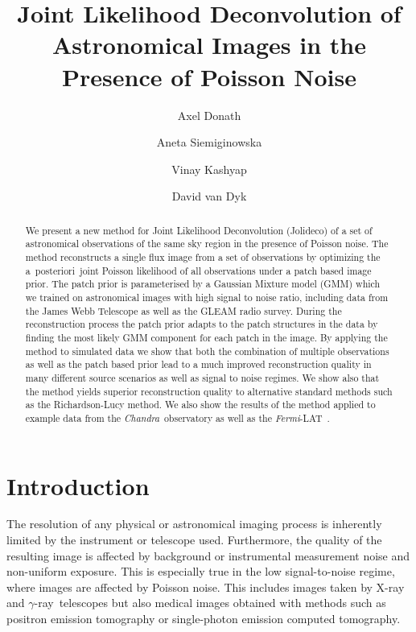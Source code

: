 \documentclass[twocolumn]{aastex631}
\newcommand{\chandra}{\textit{Chandra}~}
\newcommand{\fermi}{\textit{Fermi}-LAT~}
\newcommand{\aposteriori}{a~posteriori~}
\newcommand{\gammaray}{$\gamma$-ray\xspace}
\newcommand{\xray}{X-ray\xspace}
\begin{document}
    \title{Joint Likelihood Deconvolution of Astronomical Images in the Presence of Poisson Noise}

    \author[0000-0003-4568-7005]{Axel Donath}
    \author[0000-0002-0905-7375]{Aneta Siemiginowska}
    \author[0000-0002-3869-7996]{Vinay Kashyap} 
    \author[0000-0000-0000-0000]{David van Dyk}


    \begin{abstract}
        We present a new method for Joint Likelihood Deconvolution (Jolideco) of a set of astronomical observations of the same sky region in the presence of Poisson noise. The method reconstructs a single flux image from a set of observations by optimizing the \aposteriori joint Poisson likelihood of all observations under a patch based image prior. The patch prior is parameterised by a Gaussian Mixture model (GMM) which we trained on astronomical images with high signal to noise ratio, including data from the  James Webb Telescope as well as the GLEAM radio survey. During the reconstruction process the patch prior adapts to the patch structures in the data by finding the most likely GMM component for each patch in the image. By applying the method to simulated data we show that both the combination of multiple observations as well as the patch based prior lead to a much improved reconstruction quality in many different source scenarios as well as signal to noise regimes. We show also that the method yields superior reconstruction quality to alternative standard methods such as the Richardson-Lucy method. We also show the results of the method applied to example data from the \chandra observatory as well as the \fermi. 
    \end{abstract}



    \section{Introduction}
    The resolution of any physical or astronomical imaging process is inherently limited by the instrument or telescope used. Furthermore, the quality of the resulting image is affected by background or instrumental measurement noise and non-uniform exposure. This is especially true in the low signal-to-noise regime, where images are affected by Poisson noise. This includes images taken by \xray and \gammaray~telescopes but also medical images obtained with methods such as positron emission tomography or single-photon emission computed tomography.
\end{document}
